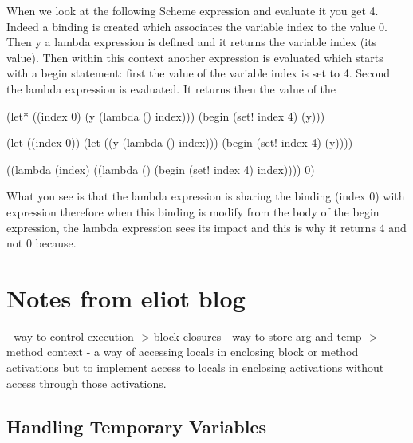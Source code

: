 \documentclass[a4paper,10pt,twoside]{book}
\begin{document}
When we look at the following Scheme expression and evaluate it you get 4. Indeed a binding is created
which associates the variable index to the value 0. Then y a lambda expression is defined and it returns
 the variable index (its value). Then within this context another expression is evaluated which starts
with a begin statement: first the value of the variable index is set to 4. Second the lambda expression is
evaluated. It returns then the value of the

\begin{code}{}
(let* ((index 0)
       (y (lambda () index)))
  (begin
    (set! index 4)
    (y)))
\end{code}

\begin{code}{}
(let ((index 0))
  (let ((y (lambda () index)))
    (begin
      (set! index 4)
      (y))))
\end{code}

\begin{code}{}
((lambda (index)
   ((lambda () (begin
                (set! index 4)
                index))))
 0)
\end{code}


What you see is that the lambda expression is sharing the binding (index 0) with expression 
therefore when this binding is modify from the body of the begin expression, the lambda expression sees its impact
and this is why it returns 4 and not 0 because.


\section{Notes from eliot blog}

- way to control execution -> block closures
- way to store arg and temp -> method context
- a way of accessing locals in enclosing block or method activations
but to implement access to locals in enclosing activations without access through those activations.










	\subsection{Handling Temporary Variables}
\end{document}
